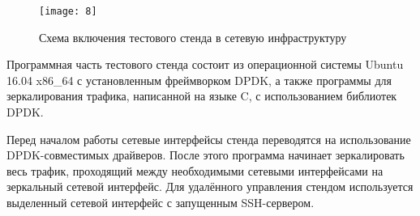 \clearpage

\begin{figure}[h!]
    \centering
    \texttt{[image: 8]}
    \caption{Схема включения тестового стенда в сетевую инфраструктуру}
    \label{img:8}
\end{figure} 

Программная часть тестового стенда состоит из операционной системы Ubuntu 16.04 x86\_64 с установленным фреймворком DPDK, а также программы для зеркалирования трафика, написанной на языке C, с использованием библиотек DPDK.\par 

Перед началом работы сетевые интерфейсы стенда переводятся на использование DPDK-совместимых драйверов. После этого программа начинает зеркалировать весь трафик, проходящий между необходимыми сетевыми интерфейсами на зеркальный сетевой интерфейс. Для удалённого управления стендом используется выделенный сетевой интерфейс с запущенным SSH-сервером.\par 
